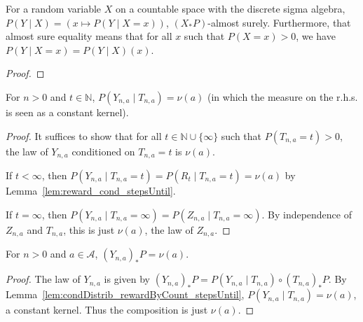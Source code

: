 \begin{lemma}\label{lem:condDistrib_ae_eq_cond}
  \leanok
For a random variable $X$ on a countable space with the discrete sigma algebra, $P(Y \mid X) = (x \mapsto P(Y \mid X = x))$, $(X_*P)$-almost surely.
Furthermore, that almost sure equality means that for all $x$ such that $P(X = x) > 0$, we have $P(Y \mid X = x) = P(Y \mid X)(x)$.
\end{lemma}

\begin{proof}\leanok

\end{proof}


\begin{lemma}\label{lem:condDistrib_rewardByCount_stepsUntil}
\leanok
For $n > 0$ and $t \in \mathbb{N}$, $P(Y_{n,a} \mid T_{n,a}) = \nu(a)$ (in which the measure on the r.h.s. is seen as a constant kernel).
\end{lemma}

\begin{proof}\leanok
It suffices to show that for all $t \in \mathbb{N} \cup \{\infty\}$ such that $P(T_{n, a} = t) > 0$, the law of $Y_{n,a}$ conditioned on $T_{n,a} = t$ is $\nu(a)$.

If $t < \infty$, then $P(Y_{n, a} \mid T_{n, a} = t) = P(R_t \mid T_{n, a} = t) = \nu(a)$ by Lemma~\ref{lem:reward_cond_stepsUntil}.

If $t = \infty$, then $P(Y_{n, a} \mid T_{n, a} = \infty) = P(Z_{n, a} \mid T_{n, a} = \infty)$. By independence of $Z_{n,a}$ and $T_{n, a}$, this is just $\nu(a)$, the law of $Z_{n,a}$.
\end{proof}


\begin{lemma}\label{lem:hasLaw_rewardByCount}
  \leanok
For $n > 0$ and $a \in \mathcal{A}$, $(Y_{n,a})_*P = \nu(a)$.
\end{lemma}

\begin{proof}\leanok
The law of $Y_{n,a}$ is given by $(Y_{n, a})_*P = P(Y_{n, a} \mid T_{n, a}) \circ (T_{n, a})_*P$.
By Lemma~\ref{lem:condDistrib_rewardByCount_stepsUntil}, $P(Y_{n, a} \mid T_{n, a}) = \nu(a)$, a constant kernel.
Thus the composition is just $\nu(a)$.
\end{proof}


